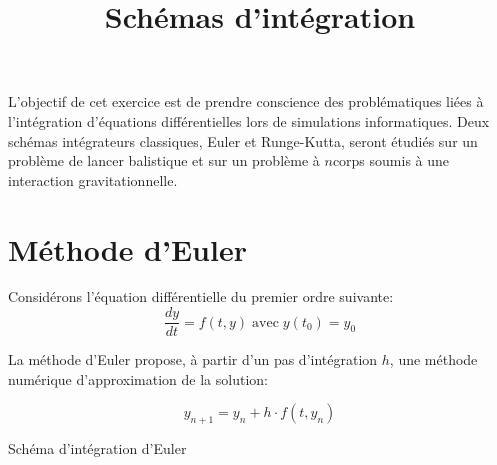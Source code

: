 \documentclass[twoside, symmetric]{tufte-handout}
\title{Schémas d'intégration}
\author{}
\date{}
\begin{document}
\maketitle%

\vspace{5mm} L'objectif de cet exercice est de prendre conscience des
problématiques liées à l'intégration d'équations différentielles lors de
simulations informatiques. Deux schémas intégrateurs classiques, Euler et
Runge-Kutta, seront étudiés sur un problème de lancer balistique et sur un
problème à $n$\;corps soumis à une interaction gravitationnelle.

\section{Méthode d'Euler}

Considérons l'équation différentielle du premier ordre suivante:
\begin{equation}
    \frac{dy}{dt} = f(t,y) \;\textrm{avec}\; y(t_0) = y_0
    \label{eqn:o1}
\end{equation}

La méthode d'Euler propose, à partir d'un pas d'intégration $h$,  une méthode
numérique d'approximation de la solution:

\begin{equation}
    y_{n+1} = y_n + h\cdot f(t,y_n)
    \label{eqn:euler}
\end{equation}

\begin{marginfigure}
    \centering
    \caption{Schéma d'intégration d'Euler}
    \label{fig:euler}
\end{marginfigure}
\end{document}
